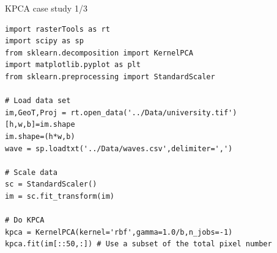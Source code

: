 \documentclass[10pt,aspectratio=1610]{beamer}
\begin{document}
\begin{frame}[fragile,label={sec:org2f8d4e2}]{KPCA case study 1/3}
 \begin{verbatim}
import rasterTools as rt
import scipy as sp
from sklearn.decomposition import KernelPCA
import matplotlib.pyplot as plt
from sklearn.preprocessing import StandardScaler

# Load data set
im,GeoT,Proj = rt.open_data('../Data/university.tif')
[h,w,b]=im.shape
im.shape=(h*w,b)
wave = sp.loadtxt('../Data/waves.csv',delimiter=',')

# Scale data
sc = StandardScaler()
im = sc.fit_transform(im)

# Do KPCA
kpca = KernelPCA(kernel='rbf',gamma=1.0/b,n_jobs=-1)
kpca.fit(im[::50,:]) # Use a subset of the total pixel number
\end{verbatim}
\end{frame}
\end{document}
